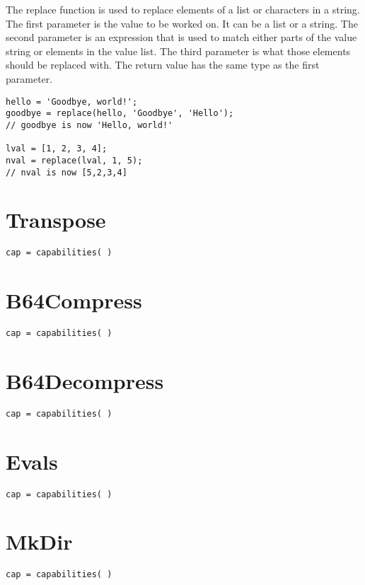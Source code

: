 The replace function is used to replace elements of a list or characters in a string. The
first parameter is the value to be worked on. It can be a list or a string. The second parameter is
an expression that is used to match either parts of the value string or elements in the value list. The third
parameter is what those elements should be replaced with. The return value has the same type
as the first parameter.

\begin{lstlisting}[capture={replace example}]
hello = 'Goodbye, world!';
goodbye = replace(hello, 'Goodbye', 'Hello');
// goodbye is now 'Hello, world!'

lval = [1, 2, 3, 4];
nval = replace(lval, 1, 5);
// nval is now [5,2,3,4]
\end{lstlisting}

\section{Transpose}
\begin{Verbatim}
cap = capabilities( )
\end{Verbatim}

\section{B64Compress}
\begin{Verbatim}
cap = capabilities( )
\end{Verbatim}

\section{B64Decompress}
\begin{Verbatim}
cap = capabilities( )
\end{Verbatim}

\section{Evals}
\begin{Verbatim}
cap = capabilities( )
\end{Verbatim}

\section{MkDir}
\begin{Verbatim}
cap = capabilities( )
\end{Verbatim}

